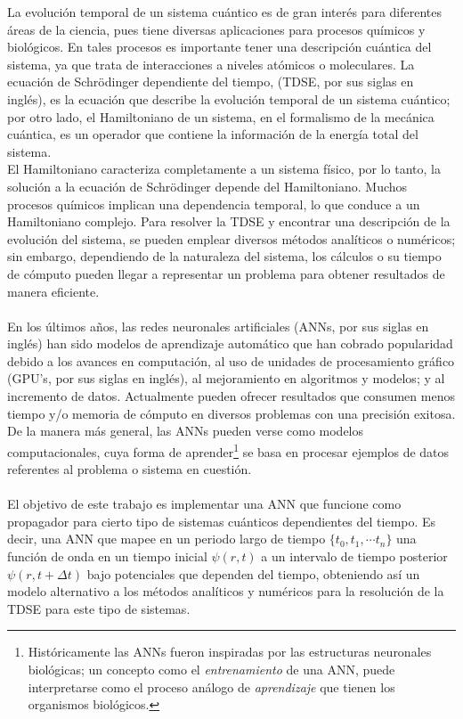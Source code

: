 La evolución temporal de un sistema cuántico es de gran interés para diferentes áreas de la ciencia, pues tiene diversas aplicaciones para procesos químicos y biológicos. En tales procesos es importante tener una descripción cuántica del sistema, ya que trata de interacciones a niveles atómicos o moleculares. La ecuación de Schrödinger dependiente del tiempo, (\acs{TDSE}, por sus siglas en inglés), es la ecuación que describe la evolución temporal de un sistema cuántico; por otro lado, el Hamiltoniano de un sistema, en el formalismo de la mecánica cuántica, es un operador que contiene la información de la energía total del sistema.
\\
El Hamiltoniano caracteriza completamente a un sistema físico, por lo tanto, la solución a la ecuación de Schrödinger depende del Hamiltoniano. Muchos procesos químicos implican una dependencia temporal, lo que conduce a un Hamiltoniano complejo. Para resolver la \acs{TDSE} y encontrar una descripción de la evolución del sistema, se pueden emplear diversos métodos analíticos o numéricos; sin embargo, dependiendo de la naturaleza del sistema, los cálculos o su tiempo de cómputo pueden llegar a representar un problema para obtener resultados de manera eficiente.
\\
\\
En los últimos años, las redes neuronales artificiales (\acs{ANN}s, por sus siglas en inglés) han sido modelos de aprendizaje automático que han cobrado popularidad debido a los avances en computación, al uso de unidades de procesamiento gráfico (GPU's, por sus siglas en inglés), al mejoramiento en algoritmos y modelos; y al incremento de datos. Actualmente pueden ofrecer resultados que consumen menos tiempo y/o memoria de cómputo en diversos problemas con una precisión exitosa. De la manera más general, las \acs{ANN}s pueden verse como modelos computacionales, cuya forma de aprender\footnote{Históricamente las \acs{ANN}s fueron inspiradas por las estructuras neuronales biológicas; un concepto como el \emph{entrenamiento} de una \acs{ANN}, puede interpretarse como el proceso análogo de \emph{aprendizaje} que tienen los organismos biológicos.} se basa en procesar ejemplos de datos referentes al problema o sistema en cuestión.
\\
\\
El objetivo de este trabajo es implementar una \acs{ANN} que funcione como propagador para cierto tipo de sistemas cuánticos dependientes del tiempo. Es decir, una \acs{ANN} que mapee en un periodo largo de tiempo $\{t_0,t_1,\cdots t_n\}$ una función de onda en un tiempo inicial $\psi(r,t)$ a un intervalo de tiempo posterior $\psi(r,t+\Delta t)$ bajo potenciales que dependen del tiempo, obteniendo así un modelo alternativo a los métodos analíticos y numéricos para la resolución de la \acs{TDSE} para este tipo de sistemas.

